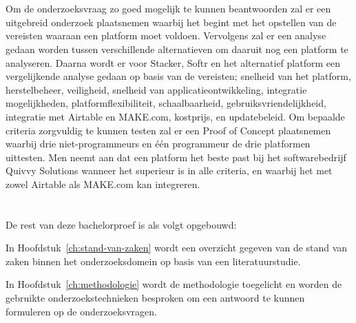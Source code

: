 \section{}%
\label{sec:onderzoeksdoelstelling}
Om de onderzoeksvraag zo goed mogelijk te kunnen beantwoorden zal er een uitgebreid onderzoek plaatsnemen waarbij het begint met het opstellen 
van de vereisten waaraan een platform moet voldoen. Vervolgens zal er een analyse gedaan worden tussen verschillende alternatieven om daaruit nog een platform 
te analyseren. Daarna wordt er voor Stacker, Softr en het alternatief platform een vergelijkende analyse gedaan op basis van de vereisten; snelheid van het platform, 
herstelbeheer, veiligheid, snelheid van applicatieontwikkeling, integratie mogelijkheden, platformflexibiliteit, schaalbaarheid, gebruiksvriendelijkheid, integratie met 
Airtable en MAKE.com, kostprijs, en updatebeleid. Om bepaalde criteria zorgvuldig te kunnen testen zal er een Proof of Concept plaatsnemen waarbij drie 
niet-programmeurs en één programmeur de drie platformen uittesten. Men neemt aan dat een platform het beste past bij het softwarebedrijf Quivvy Solutions wanneer het superieur is in alle criteria, en 
waarbij het met zowel Airtable als MAKE.com kan integreren.

\section{}%
\label{sec:opzet-bachelorproef}


De rest van deze bachelorproef is als volgt opgebouwd:

In Hoofdstuk~\ref{ch:stand-van-zaken} wordt een overzicht gegeven van de stand van zaken binnen het onderzoeksdomein op basis van een literatuurstudie.

In Hoofdstuk~\ref{ch:methodologie} wordt de methodologie toegelicht en worden de gebruikte onderzoekstechnieken besproken om een antwoord te kunnen formuleren op de onderzoeksvragen.

